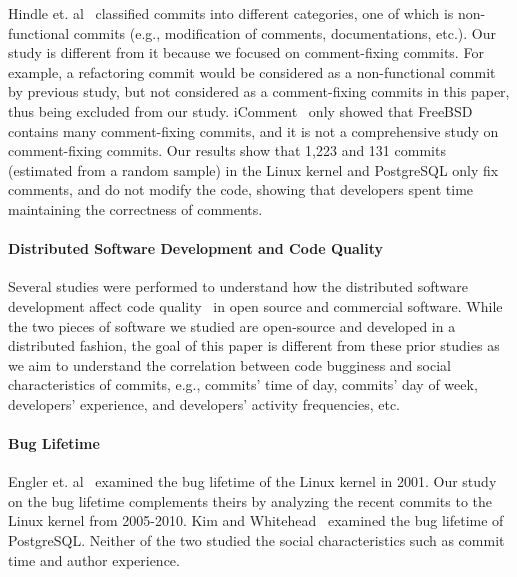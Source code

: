 Hindle et. al~\cite{largeCommits} classified commits into different categories, one of which 
is non-functional commits (e.g., modification of comments, documentations, etc.).
Our study is different from it because we focused on
comment-fixing commits. For example, a refactoring commit 
would be considered as a non-functional commit by previous study, but not considered as a comment-fixing commits in this paper, 
thus being excluded from our study. 
iComment~\cite{iComment} only showed that FreeBSD contains many comment-fixing commits, and it is 
not a comprehensive study on comment-fixing commits.  
Our results show that 1,223 and 131 commits (estimated from a random sample) 
in the Linux kernel and PostgreSQL only fix comments, and do not modify the code, showing
that developers spent time maintaining the correctness of comments. 


\paragraph{Distributed Software Development and Code Quality}
Several studies were performed to understand how the distributed software development affect 
code quality~\cite{distributed09, organizational08, global06} in open source and commercial 
software. While the two pieces of software we studied are open-source and developed in a distributed fashion,  
the goal of this paper is different from these prior studies as we aim to understand the correlation
between code bugginess and social characteristics of commits, e.g., commits' time of day, commits' day 
of week, developers' experience, and developers' activity frequencies, etc. 

\paragraph{Bug Lifetime}
Engler et. al~\cite{deviant} examined the bug lifetime of the Linux kernel in 2001. 
Our study on the bug lifetime complements theirs by analyzing the recent commits to the Linux kernel from 2005-2010.
Kim and Whitehead~\cite{2006-long} examined the bug lifetime of PostgreSQL.
Neither of the two studied the social characteristics such as commit time and author
experience. 



